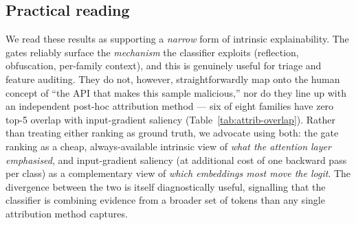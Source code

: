 \subsection{Practical reading}

We read these results as supporting a \emph{narrow} form of
intrinsic explainability. The gates reliably surface the
\emph{mechanism} the classifier exploits (reflection, obfuscation,
per-family context), and this is genuinely useful for triage and
feature auditing. They do not, however, straightforwardly map onto
the human concept of ``the API that makes this sample malicious,''
nor do they line up with an independent post-hoc attribution
method --- six of eight families have zero top-5 overlap with
input-gradient saliency (Table~\ref{tab:attrib-overlap}). Rather
than treating either ranking as ground truth, we advocate using
both: the gate ranking as a cheap, always-available intrinsic
view of \emph{what the attention layer emphasised}, and
input-gradient saliency (at additional cost of one backward pass
per class) as a complementary view of \emph{which embeddings
most move the logit}. The divergence between the two is itself
diagnostically useful, signalling that the classifier is
combining evidence from a broader set of tokens than any single
attribution method captures.
